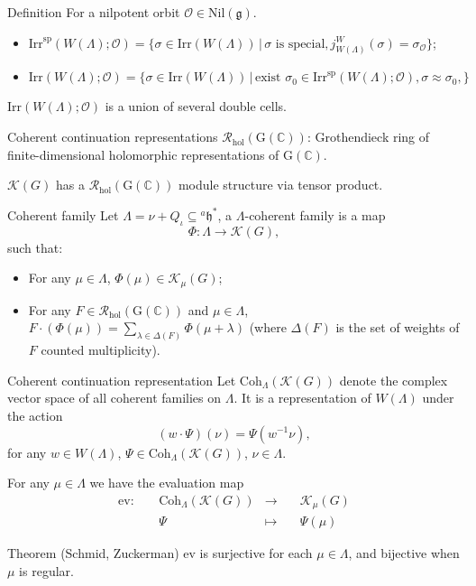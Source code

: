 \documentclass[fleqn,xcolor=dvipsnames]{beamer}
\newcommand{\BC}{{\mathbb {C}}}
\newcommand{\CK}{{\mathcal {K}}}
\newcommand{\CO}{{\mathcal {O}}}
\newcommand{\CR}{{\mathcal {R}}}
\newcommand{\RG}{{\mathrm {G}}}
\newcommand{\fg}{\mathfrak{g}}
\newcommand{\fh}{\mathfrak{h}}
\newcommand{\Irr}{{\mathrm{Irr}}}
\newcommand{\Nil}{{\mathrm{Nil}}}
\newcommand{\set}[2]{\{#1\,|\,#2\}}
\newcommand{\defmap}[5]{
           \begin{equation*}
              \begin{aligned}
                   #1:\quad  & #2 &\longrightarrow &\quad #3 \\
                      \quad  & #4    &\longmapsto  &\quad #5
              \end{aligned}
           \end{equation*}
          }
\begin{document}
\begin{frame}
  \begin{block}{Definition}
    For a nilpotent orbit $\CO \in \Nil(\fg)$.
    \begin{itemize}
      \item $\Irr^{\mathrm{sp}}(W(\Lambda);\CO) = \set{\sigma \in \Irr(W(\Lambda))}{\textrm{$\sigma$ is special}, j_{W(\Lambda)}^{W}(\sigma) = \sigma_{\CO}}$;
      \pause\item $\Irr(W(\Lambda);\CO) = \set{\sigma \in \Irr(W(\Lambda))}{\textrm{exist $\sigma_{0} \in \Irr^{\mathrm{sp}}(W(\Lambda);\CO)$}, \sigma \approx \sigma_{0}, }$
    \end{itemize}
  \end{block}
  \pause$\Irr(W(\Lambda);\CO)$ is a union of several double cells.
\end{frame}



\begin{frame}{Coherent continuation representations}
  $\CR_{\mathrm{hol}}(\RG(\BC))$: Grothendieck ring of finite-dimensional holomorphic representations of $\RG(\BC)$.\par
  \pause$\CK(G)$ has a $\CR_{\mathrm{hol}}(\RG(\BC))$ module structure via tensor product.
  \pause\begin{block}{Coherent family}
    Let $\Lambda = \nu + Q_{\iota} \subseteq {^{a}\fh}^*$, a \alert{$\Lambda$-coherent family}  is a map
   $$\Phi: \Lambda \to \CK(G),$$
   such that:
   \begin{itemize}
      \item For any $\mu \in \Lambda$, $\Phi(\mu) \in \CK_{\mu}(G)$;
      \item For any $F \in \CR_{\mathrm{hol}}(\RG(\BC))$ and $\mu \in \Lambda$, $F \cdot (\Phi(\mu)) = \sum_{\lambda \in \Delta(F)} \Phi(\mu + \lambda)$ (where $\Delta(F)$ is the set of weights of $F$ counted multiplicity).
   \end{itemize}
  \end{block}
\end{frame}






\begin{frame}
  \begin{block}{Coherent continuation representation}
  Let $\mathrm{Coh}_{\Lambda}(\CK(G))$ denote the complex vector space of all coherent families on $\Lambda$. It is a representation of $W(\Lambda)$ under the action
  \[(w \cdot \Psi)(\nu) = \Psi(w^{-1}\nu),\]
  for any $w \in W(\Lambda)$, $\Psi \in \mathrm{Coh}_{\Lambda}(\CK(G))$, $\nu \in \Lambda$.
  \end{block}
    \pause For any $\mu \in \Lambda$ we have the evaluation map \defmap{\mathrm{ev}}{\mathrm{Coh}_{\Lambda}(\CK(G))}{\CK_{\mu}(G)}{\Psi}{\Psi(\mu)}
  \pause\begin{block}{Theorem (Schmid, Zuckerman)}
    $\mathrm{ev}$ is surjective for each $\mu \in \Lambda$, and bijective when $\mu$ is regular.
  \end{block}

\end{frame}
\end{document}
